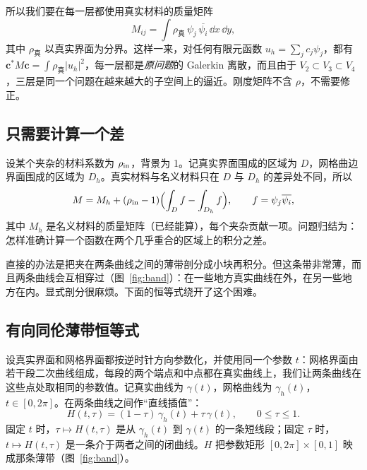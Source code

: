 \documentclass[11pt,a4paper,fontset=fandol]{ctexart}
\begin{document}
所以我们要在每一层都使用真实材料的质量矩阵
\[
M_{ij}=\int\rho_{\text{真}}\,\psi_j\,\overline{\psi_i}\,\dd x\,\dd y ,
\]
其中 $\rho_{\text{真}}$ 以真实界面为分界。这样一来，对任何有限元函数 $u_h=\sum_jc_j\psi_j$，都有 $\bm c^*M\bm c=\int\rho_{\text{真}}|u_h|^2$，每一层都是\emph{原问题}的 Galerkin 离散，而且由于 $V_2\subset V_3\subset V_4$，三层是同一个问题在越来越大的子空间上的逼近。刚度矩阵不含 $\rho$，不需要修正。

\subsection{只需要计算一个差}

设某个夹杂的材料系数为 $\rho_{\rm in}$，背景为 1。记真实界面围成的区域为 $D$，网格曲边界面围成的区域为 $D_h$。真实材料与名义材料只在 $D$ 与 $D_h$ 的差异处不同，所以
\[
M=M_h+(\rho_{\rm in}-1)\Bigl(\int_Df-\int_{D_h}f\Bigr),\qquad f=\psi_j\overline{\psi_i},
\]
其中 $M_h$ 是名义材料的质量矩阵（已经能算），每个夹杂贡献一项。问题归结为：怎样准确计算一个函数在两个几乎重合的区域上的积分之差。

直接的办法是把夹在两条曲线之间的薄带剖分成小块再积分。但这条带非常薄，而且两条曲线会互相穿过（图~\ref{fig:band}）：在一些地方真实曲线在外，在另一些地方在内。显式剖分很麻烦。下面的恒等式绕开了这个困难。

\subsection{有向同伦薄带恒等式}

设真实界面和网格界面都按逆时针方向参数化，并使用同一个参数 $t$：网格界面由若干段二次曲线组成，每段的两个端点和中点都在真实曲线上，我们让两条曲线在这些点处取相同的参数值。记真实曲线为 $\gamma(t)$，网格曲线为 $\gamma_h(t)$，$t\in[0,2\pi]$。在两条曲线之间作“直线插值”：
\[
H(t,\tau)=(1-\tau)\,\gamma_h(t)+\tau\,\gamma(t),\qquad 0\le\tau\le1 .
\]
固定 $t$ 时，$\tau\mapsto H(t,\tau)$ 是从 $\gamma_h(t)$ 到 $\gamma(t)$ 的一条短线段；固定 $\tau$ 时，$t\mapsto H(t,\tau)$ 是一条介于两者之间的闭曲线。$H$ 把参数矩形 $[0,2\pi]\times[0,1]$ 映成那条薄带（图~\ref{fig:band}）。
\end{document}
